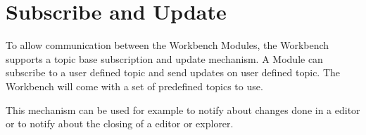 \section{Subscribe and Update}
To allow communication between the Workbench Modules, the Workbench supports a topic base subscription and update mechanism. A Module can subscribe to a user defined topic and send updates on user defined topic. The Workbench will come with a set of predefined topics to use.

This mechanism can be used for example to notify about changes done in a editor or to notify about the closing of a editor or explorer.
